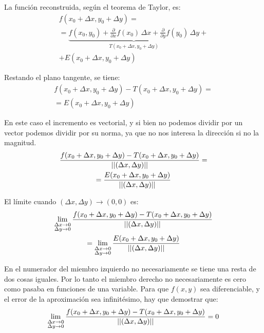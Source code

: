 \documentclass[a5paper,12pt,twoside]{book}
\begin{document}
La función reconstruida, según el teorema de Taylor, es:
\begin{multline*}
    f(x_0 + \Delta x,y_0 + \Delta y) =
    \\
    = \underbrace{f(x_0,y_0) + \frac{\partial}{\partial x} f(x_0) \, \Delta x + \frac{\partial}{\partial y} f(y_0) \, \Delta y}_{T(x_0 + \Delta x,y_0 + \Delta y)} +
    \\
    + E(x_0 + \Delta x,y_0 + \Delta y)
\end{multline*}

Restando el plano tangente, se tiene:
\begin{multline*}
    f(x_0 + \Delta x,y_0 + \Delta y) - T(x_0 + \Delta x,y_0 + \Delta y) =
    \\
    = E(x_0 + \Delta x,y_0 + \Delta y)
\end{multline*}

En este caso el incremento es vectorial, y si bien no podemos dividir por un vector podemos dividir por su norma, ya que no nos interesa la dirección si no la magnitud.
\begin{multline*}
    \frac{f(x_0 + \Delta x,y_0 + \Delta y) - T(x_0 + \Delta x,y_0 + \Delta y)}{{\left|\left| {(\Delta x,\Delta y)} \right|\right|}} =
    \\
    = \frac{E(x_0 + \Delta x,y_0 + \Delta y)}{{\left|\left| {(\Delta x,\Delta y)} \right|\right|}}
\end{multline*}

El límite cuando $(\Delta x,\Delta y) \to (0,0)$ es:
\begin{multline*}
    \lim_{\substack{\Delta x \to 0 \\ \Delta y \to 0}} \frac{f(x_0 + \Delta x,y_0 + \Delta y) - T(x_0 + \Delta x,y_0 + \Delta y)}{{\left|\left| {(\Delta x,\Delta y)} \right|\right|}}
    \\
    = \lim_{\substack{\Delta x \to 0 \\ \Delta y \to 0}} \frac{E(x_0 + \Delta x,y_0 + \Delta y)}{{\left|\left| {(\Delta x,\Delta y)} \right|\right|}}
\end{multline*}

En el numerador del miembro izquierdo no necesariamente se tiene una resta de dos cosas iguales. Por lo tanto el miembro derecho no necesariamente es cero como pasaba en funciones de una variable. Para que $f(x,y)$ sea diferenciable, y el error de la aproximación sea infinitésimo, hay que demostrar que:
\begin{equation*}
    \lim_{\substack{\Delta x \to 0 \\ \Delta y \to 0}} \frac{f(x_0 + \Delta x,y_0 + \Delta y) - T(x_0 + \Delta x,y_0 + \Delta y)}{{\left|\left| {(\Delta x,\Delta y)} \right|\right|}} = 0
\end{equation*}
\end{document}
